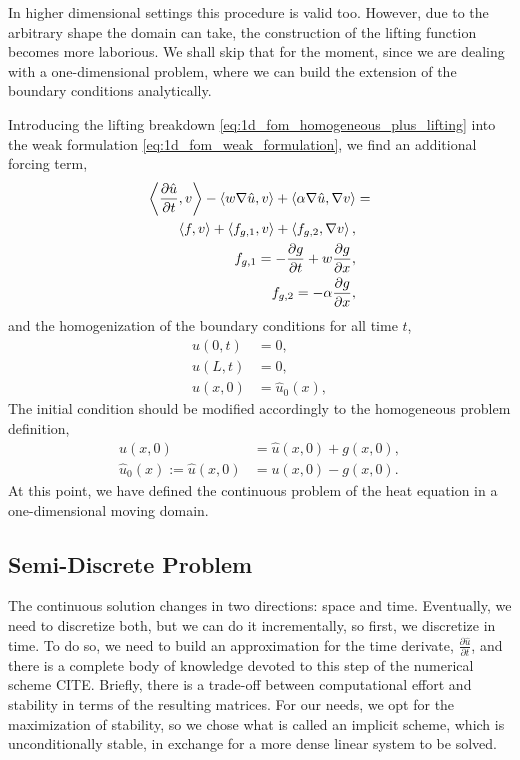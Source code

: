 \documentclass[../main.tex]{subfiles}
\newcommand{\inner}[2]{\left<#1, #2\right>}
\begin{document}
In higher dimensional settings this procedure is valid too. 
However, due to the arbitrary shape the domain can take, the construction of the lifting function becomes more laborious.
We shall skip that for the moment, since we are dealing with a one-dimensional problem, where we can build the extension of the boundary conditions analytically. 

Introducing the lifting breakdown \eqref{eq:1d_fom_homogeneous_plus_lifting} into the weak formulation \eqref{eq:1d_fom_weak_formulation},
we find an additional forcing term,
\begin{subequations}
    \label{eq:1d_fom_weak_formulation_homogeneous}
    \begin{align}
        \inner{\frac{\partial \hat{u}}{\partial t}}{v} - \inner{w \grad \hat{u}}{v} + \inner{\alpha \grad \hat{u}}{\grad v} &= \nonumber \\  
        \inner{f}{v} + \inner{f_{g,1}}{v} + \inner{f_{g,2}}{\grad v}, \\
        f_{g,1} = - \frac{\partial g}{\partial t} + w \pdv{g}{x}, \\
        f_{g,2} = - \alpha \pdv{g}{x},
    \end{align}
\end{subequations}
and the homogenization of the boundary conditions for all time $t$,
\begin{subequations}
    \begin{align}
        \hat{u}(0, t) &= 0, \\
        \hat{u}(L, t) &= 0, \\
        \hat{u}(x, 0) &= \hat{u}_0(x),
    \end{align}
\end{subequations}
The initial condition should be modified accordingly to the homogeneous problem definition, 
\begin{subequations}
    \begin{align}
    u(x,0) &= \hat{u}(x,0) + g(x,0), \\ 
    \hat{u}_0(x):= \hat{u}(x,0) &= u(x,0) - g(x,0) . 
    \end{align}
\end{subequations}
At this point, we have defined the continuous problem of the heat equation in a one-dimensional moving domain. 

\subsection{Semi-Discrete Problem}
The continuous solution changes in two directions: space and time.
Eventually, we need to discretize both, but we can do it incrementally, so first, we discretize in time. 
To do so, we need to build an approximation for the time derivate, $\frac{\partial \hat{u}}{\partial t}$, and there is a complete body of knowledge devoted to this step of the numerical scheme CITE. 
Briefly, there is a trade-off between computational effort and stability in terms of the resulting matrices.
For our needs, we opt for the maximization of stability, so we chose what is called an implicit scheme, which is unconditionally stable, in exchange for a more dense linear system to be solved. 
\end{document}
